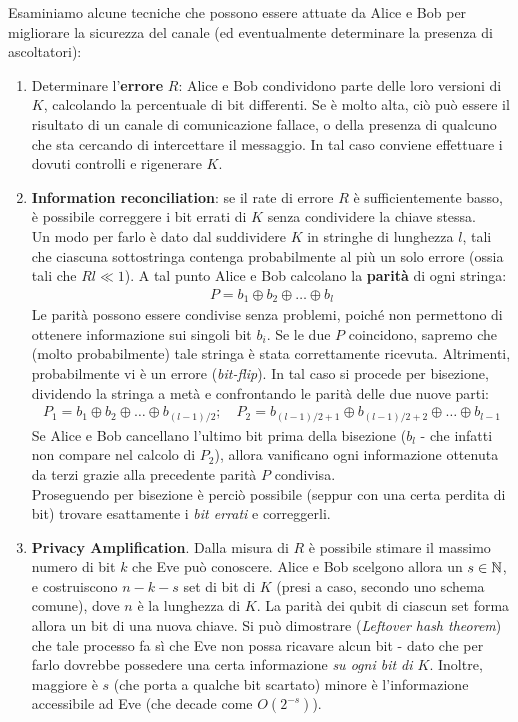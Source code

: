 \documentclass[../../InformazioneQuantistica.tex]{subfiles}
\begin{document}
Esaminiamo alcune tecniche che possono essere attuate da Alice e Bob per migliorare la sicurezza del canale (ed eventualmente determinare la presenza di ascoltatori):
\begin{enumerate}
\item Determinare l'\textbf{errore} $R$: Alice e Bob condividono parte delle loro versioni di $K$, calcolando la percentuale di bit differenti. Se è molto alta, ciò può essere il risultato di un canale di comunicazione fallace, o della presenza di qualcuno che sta cercando di intercettare il messaggio. In tal caso conviene effettuare i dovuti controlli e rigenerare $K$.
\item \textbf{Information reconciliation}: se il rate di errore $R$ è sufficientemente basso, è possibile correggere i bit errati di $K$ senza condividere la chiave stessa.\\
Un modo per farlo è dato dal suddividere $K$ in stringhe di lunghezza $l$, tali che ciascuna sottostringa contenga probabilmente al più un solo errore (ossia tali che $Rl \ll 1$). A tal punto Alice e Bob calcolano la \textbf{parità} di ogni stringa:
\begin{align*}
    P = b_1 \oplus b_2 \oplus \dots \oplus b_l
\end{align*}
Le parità possono essere condivise senza problemi, poiché non permettono di ottenere informazione sui singoli bit $b_i$. Se le due $P$ coincidono, sapremo che (molto probabilmente) tale stringa è stata correttamente ricevuta. Altrimenti, probabilmente vi è un errore (\textit{bit-flip}). In tal caso si procede per bisezione, dividendo la stringa a metà e confrontando le parità delle due nuove parti:
\begin{align*}
    P_1 = b_1 \oplus b_2 \oplus \dots \oplus b_{(l-1)/2}; \quad P_2 = b_{(l-1)/2+1} \oplus b_{(l-1)/2+2} \oplus \dots \oplus b_{l-1}
\end{align*}
Se Alice e Bob cancellano l'ultimo bit prima della bisezione ($b_l$ - che infatti non compare nel calcolo di $P_2$), allora vanificano ogni informazione ottenuta da terzi grazie alla precedente parità $P$ condivisa.\\
Proseguendo per bisezione è perciò possibile (seppur con una certa perdita di bit) trovare esattamente i \textit{bit errati} e correggerli.
\item \textbf{Privacy Amplification}. Dalla misura di $R$ è possibile stimare il massimo numero di bit $k$ che Eve può conoscere. Alice e Bob scelgono allora un $s \in \mathbb{N}$, e costruiscono $n-k-s$ set di bit di $K$ (presi a caso, secondo uno schema comune), dove $n$ è la lunghezza di $K$. La parità dei qubit di ciascun set forma allora un bit di una nuova chiave. Si può dimostrare (\textit{Leftover hash theorem}) che tale processo fa sì che Eve non possa ricavare alcun bit - dato che per farlo dovrebbe possedere una certa informazione \textit{su ogni bit di $K$}. Inoltre, maggiore è $s$ (che porta a qualche bit scartato) minore è l'informazione accessibile ad Eve (che decade come $O(2^{-s})$).
\end{enumerate}
\end{document}
